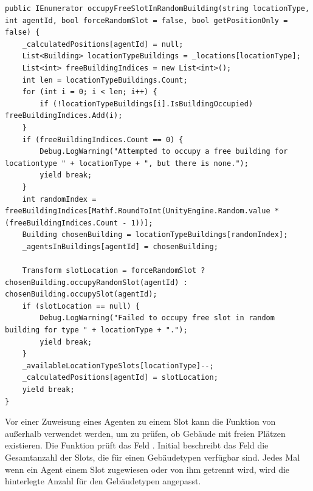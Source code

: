 \begin{minipage}{\linewidth}
\begin{lstlisting}[linewidth=16.4cm, label=lst:village_location-handler_example, caption=Auswahl von zufälligen Gebäuden in der Klasse \inlinecode{LocationHandler} , xleftmargin=1cm]
public IEnumerator occupyFreeSlotInRandomBuilding(string locationType, int agentId, bool forceRandomSlot = false, bool getPositionOnly = false) {
    _calculatedPositions[agentId] = null;
    List<Building> locationTypeBuildings = _locations[locationType];
    List<int> freeBuildingIndices = new List<int>();
    int len = locationTypeBuildings.Count;
    for (int i = 0; i < len; i++) {
        if (!locationTypeBuildings[i].IsBuildingOccupied) freeBuildingIndices.Add(i);
    }
    if (freeBuildingIndices.Count == 0) {
        Debug.LogWarning("Attempted to occupy a free building for locationtype " + locationType + ", but there is none.");
        yield break;
    }
    int randomIndex = freeBuildingIndices[Mathf.RoundToInt(UnityEngine.Random.value * (freeBuildingIndices.Count - 1))];
    Building chosenBuilding = locationTypeBuildings[randomIndex];
    _agentsInBuildings[agentId] = chosenBuilding;

    Transform slotLocation = forceRandomSlot ? chosenBuilding.occupyRandomSlot(agentId) : chosenBuilding.occupySlot(agentId);
    if (slotLocation == null) {
        Debug.LogWarning("Failed to occupy free slot in random building for type " + locationType + ".");
        yield break;
    }
    _availableLocationTypeSlots[locationType]--;
    _calculatedPositions[agentId] = slotLocation;
    yield break;
}
\end{lstlisting}
\end{minipage}


Vor einer Zuweisung eines Agenten zu einem Slot kann die Funktion  von außerhalb verwendet werden, um zu prüfen, ob Gebäude mit freien Plätzen existieren. Die Funktion prüft das Feld . Initial beschreibt das Feld die Gesamtanzahl der Slots, die für einen Gebäudetypen verfügbar sind. Jedes Mal wenn ein Agent einem Slot zugewiesen oder von ihm getrennt wird, wird die hinterlegte Anzahl für den Gebäudetypen angepasst.






